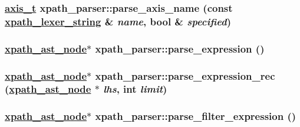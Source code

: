 \hypertarget{structxpath__parser_d67ec26e0e286ca1bb5144a79e3a3583}{
\subsubsection[parse\_\-axis\_\-name]{\setlength{\rightskip}{0pt plus 5cm}\hyperlink{pugixml_8cpp_e7747145441b0591a5c04f20f6f9189a}{axis\_\-t} xpath\_\-parser::parse\_\-axis\_\-name (const \hyperlink{structxpath__lexer__string}{xpath\_\-lexer\_\-string} \& {\em name}, bool \& {\em specified})}}
\label{structxpath__parser_d67ec26e0e286ca1bb5144a79e3a3583}


\hypertarget{structxpath__parser_db814ff3b99621d2a1c8e788ffd1c1c5}{
\subsubsection[parse\_\-expression]{\setlength{\rightskip}{0pt plus 5cm}\hyperlink{classxpath__ast__node}{xpath\_\-ast\_\-node}$\ast$ xpath\_\-parser::parse\_\-expression ()}}
\label{structxpath__parser_db814ff3b99621d2a1c8e788ffd1c1c5}


\hypertarget{structxpath__parser_dfd2ab26b101a03ed79d7c3041539115}{
\subsubsection[parse\_\-expression\_\-rec]{\setlength{\rightskip}{0pt plus 5cm}\hyperlink{classxpath__ast__node}{xpath\_\-ast\_\-node}$\ast$ xpath\_\-parser::parse\_\-expression\_\-rec (\hyperlink{classxpath__ast__node}{xpath\_\-ast\_\-node} $\ast$ {\em lhs}, int {\em limit})}}
\label{structxpath__parser_dfd2ab26b101a03ed79d7c3041539115}


\hypertarget{structxpath__parser_0530aefc1445c4eac4614e895dd0a219}{
\subsubsection[parse\_\-filter\_\-expression]{\setlength{\rightskip}{0pt plus 5cm}\hyperlink{classxpath__ast__node}{xpath\_\-ast\_\-node}$\ast$ xpath\_\-parser::parse\_\-filter\_\-expression ()}}
\label{structxpath__parser_0530aefc1445c4eac4614e895dd0a219}


